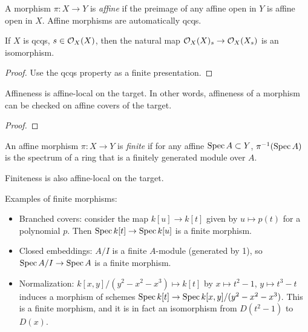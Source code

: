 \documentclass[11pt]{amsart}
\begin{document}
\begin{defn}
A morphism $\pi:X\to Y$ is \emph{affine} if the preimage of any affine open in $Y$ is affine open in $X$. Affine morphisms are automatically qcqs.
\end{defn}

\begin{lem}
If $X$ is qcqs, $s\in \mathcal{O}_X(X)$, then the natural map $\mathcal{O}_X(X)_s \to \mathcal{O}_X(X_s)$ is an isomorphism.
\end{lem}

\begin{proof}
Use the qcqs property as a finite presentation.
\end{proof}

\begin{prop}
Affineness is affine-local on the target. In other words, affineness of a morphism can be checked on affine covers of the target.
\end{prop}

\begin{proof}

\end{proof}

\begin{defn}
An affine morphism $\pi: X\to Y$ is \emph{finite} if for any affine $\operatorname{Spec} A\subset Y$, $\pi^{-1}(\operatorname{Spec} A)$ is the spectrum of a ring that is a finitely generated module over $A$.
\end{defn}

Finiteness is also affine-local on the target.

\begin{exm}
Examples of finite morphisms:

\begin{itemize}
    \item Branched covers: consider the map $k[u] \to k[t]$ given by $u\mapsto p(t)$ for a polynomial $p$. Then $\operatorname{Spec} k[t] \to \operatorname{Spec} k[u]$ is a finite morphism.
    
    \item Closed embeddings: $A/I$ is a finite $A$-module (generated by 1), so $\operatorname{Spec} A/I \to \operatorname{Spec} A$ is a finite morphism.
    
    \item Normalization: $k[x,y]/(y^2-x^2-x^3) \mapsto k[t]$ by $x\mapsto t^2-1$, $y\mapsto t^3-t$ induces a morphism of schemes $\operatorname{Spec} k[t] \to \operatorname{Spec} k[x,y]/(y^2-x^2-x^3)$. This is a finite morphism, and it is in fact an isomorphism from $D(t^2-1)$ to $D(x)$.
\end{itemize}
\end{exm}
\end{document}
